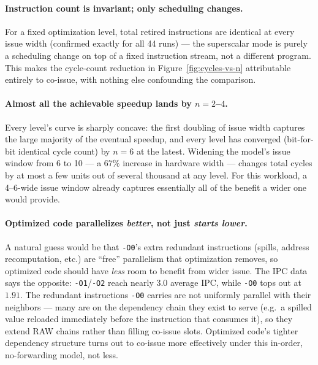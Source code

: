 \documentclass[11pt]{article}
\begin{document}
\paragraph{Instruction count is invariant; only scheduling changes.}
For a fixed optimization level, total retired instructions are identical at
every issue width (confirmed exactly for all 44 runs) --- the superscalar
mode is purely a scheduling change on top of a fixed instruction stream, not
a different program. This makes the cycle-count reduction in
Figure~\ref{fig:cycles-vs-n} attributable entirely to co-issue, with nothing
else confounding the comparison.

\paragraph{Almost all the achievable speedup lands by $n=2$--$4$.} Every
level's curve is sharply concave: the first doubling of issue width
captures the large majority of the eventual speedup, and every level has
converged (bit-for-bit identical cycle count) by $n=6$ at the latest.
Widening the model's issue window from 6 to 10 --- a $67\%$ increase in
hardware width --- changes total cycles by at most a few units out of
several thousand at any level. For this workload, a 4--6-wide issue window
already captures essentially all of the benefit a wider one would provide.

\paragraph{Optimized code parallelizes \emph{better}, not just \emph{starts
lower}.} A natural guess would be that \texttt{-O0}'s extra redundant
instructions (spills, address recomputation, etc.) are ``free'' parallelism
that optimization removes, so optimized code should have \emph{less} room
to benefit from wider issue. The IPC data says the opposite:
\texttt{-O1}/\texttt{-O2} reach nearly $3.0$ average IPC, while \texttt{-O0}
tops out at $1.91$. The redundant instructions \texttt{-O0} carries are not
uniformly parallel with their neighbors --- many are on the dependency chain
they exist to serve (e.g.\ a spilled value reloaded immediately before the
instruction that consumes it), so they extend RAW chains rather than
filling co-issue slots. Optimized code's tighter dependency structure
turns out to co-issue more effectively under this in-order, no-forwarding
model, not less.
\end{document}
